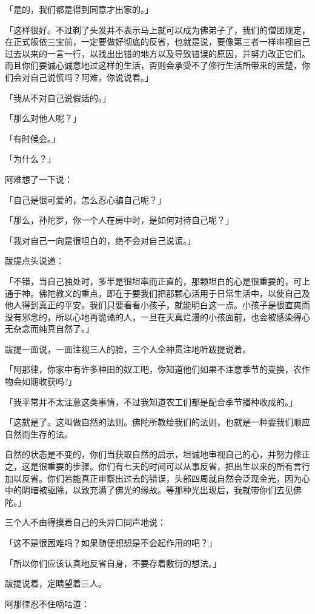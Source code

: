 \documentclass[twoside,openany]{book}
\begin{document}
「是的，我们都是得到同意才出家的。」

「这样很好。不过剃了头发并不表示马上就可以成为佛弟子了，我们的僧团规定，在正式皈依三宝前，一定要做好彻底的反省，也就是说，要像第三者一样审视自己过去以来的一言一行，以找出出错的地方以及导致错误的原因，并努力改正它们。而且你们要诚心诚意地过这样的生活，否则会承受不了修行生活所带来的苦楚，你们会对自己说慌吗？阿难，你说说看。」

「我从不对自己说假话的。」

「那么对他人呢？」

「有时候会。」

「为什么？」

阿难想了一下说：

「自己是很可爱的，怎么忍心骗自己呢？」

「那么，孙陀罗，你一个人在房中时，是如何对待自己呢？」

「我对自己一向是很坦白的，绝不会对自己说谎。」

跋提点头说道：

「不错，当自己独处时，多半是很坦率而正直的，那颗坦白的心是很重要的，可上通于神。佛陀教义的重点，即在于要我们把那颗心活用于日常生活中，以使自己及他人得到真正的平安。我们只要看看小孩子，就能明白这一点。小孩子是很直爽而没有邪念的，所以心地再诡谲的人，一旦在天真烂漫的小孩面前，也会被感染得心无杂念而纯真自然了。」

跋提一面说，一面注视三人的脸，三个人全神贯注地听跋提说着。

「阿那律，你家中有许多种田的奴工吧，你知道他们如果不注意季节的变换，农作物会如期收获吗?」

「我平常并不太注意这类事情，不过我知道农工们都是配合季节播种收成的。」

「这就是了。这叫做自然的法则。佛陀所教给我们的法则，也就是一种要我们顺应自然而生存的法。

自然的状态是不变的，你们当获取自然的启示，坦诚地审视自己的心，并努力修正之，这是很重要的步骤。你们有七天的时间可以从事反省，把出生以来的所有言行加以反省。你们若能真正审察出过去的错误，头部四周就自然会泛现金光，因为心中的阴暗被驱除，以致充满了佛光的缘故。等那种光出现后，我就带你们去见佛陀。」

三个人不由得摸着自己的头异口同声地说：

「这不是很困难吗？如果随便想想是不会起作用的吧？」

「所以你们应该认真地反省自身，不要存着敷衍的想法。」

跋提说着，定睛望着三人。

阿那律忍不住嘀咕道：
\end{document}
